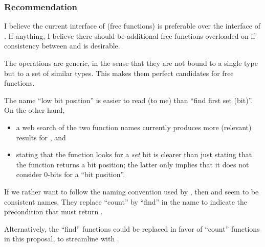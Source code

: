 \subsubsection{Recommendation}
I believe the current interface of \mask (free functions) is preferable over the interface of .
If anything, I believe there should be additional free functions overloaded on  if consistency between \mask and  is desirable.

The operations are generic, in the sense that they are not bound to a single type but to a set of similar types.
This makes them perfect candidates for free functions.

The name “low bit position” is easier to read (to me) than “find first set (bit)”.
On the other hand,
\begin{itemize}
    \item a web search of the two function names currently produces more (relevant) results for , and
    \item stating that the function looks for a \emph{set} bit is clearer than just stating that the function returns a bit position; the latter only implies that it does not consider 0-bits for a “bit position”.
\end{itemize}

If we rather want to follow the naming convention used by \textcite{P0553R1}, then  and  seem to be consistent names.
They replace “count” by “find” in the name to indicate the precondition that  must return \true.

Alternatively, the “find” functions could be replaced in favor of “count” functions in this proposal, to streamline with \textcite{P0553R1}.

